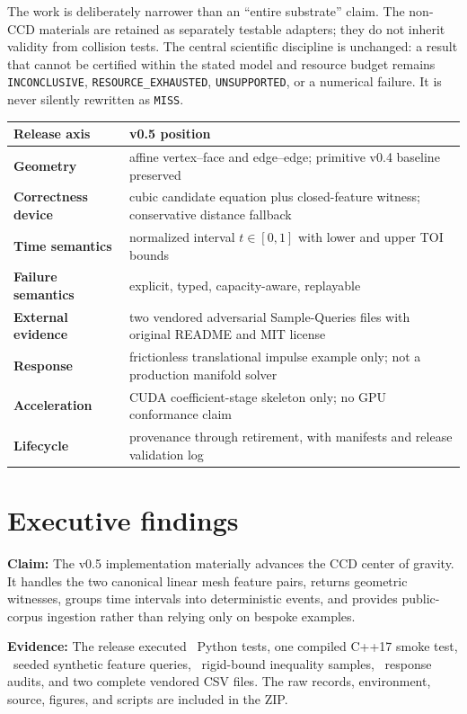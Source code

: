 \documentclass[11pt,a4paper,oneside]{book}
\newcommand{\status}[1]{\texttt{#1}}
\newcommand{\claim}[1]{\textbf{Claim:} #1}
\newcommand{\evidence}[1]{\textbf{Evidence:} #1}
\begin{document}
The work is deliberately narrower than an ``entire substrate'' claim. The non-CCD materials are retained as separately testable adapters; they do not inherit validity from collision tests. The central scientific discipline is unchanged: a result that cannot be certified within the stated model and resource budget remains \status{INCONCLUSIVE}, \status{RESOURCE\_EXHAUSTED}, \status{UNSUPPORTED}, or a numerical failure. It is never silently rewritten as \status{MISS}.

\begin{center}
\begin{tabularx}{0.94\textwidth}{>{\bfseries}p{}X}
\toprule
Release axis & v0.5 position\\
\midrule
Geometry & affine vertex--face and edge--edge; primitive v0.4 baseline preserved\\
Correctness device & cubic candidate equation plus closed-feature witness; conservative distance fallback\\
Time semantics & normalized interval $t\in[0,1]$ with lower and upper TOI bounds\\
Failure semantics & explicit, typed, capacity-aware, replayable\\
External evidence & two vendored adversarial Sample-Queries files with original README and MIT license\\
Response & frictionless translational impulse example only; not a production manifold solver\\
Acceleration & CUDA coefficient-stage skeleton only; no GPU conformance claim\\
Lifecycle & provenance through retirement, with manifests and release validation log\\
\bottomrule
\end{tabularx}
\end{center}

\chapter*{Executive findings}

\claim{The v0.5 implementation materially advances the CCD center of gravity.} It handles the two canonical linear mesh feature pairs, returns geometric witnesses, groups time intervals into deterministic events, and provides public-corpus ingestion rather than relying only on bespoke examples.

\evidence{The release executed \PythonTests\ Python tests, one compiled C++17 smoke test, \SyntheticTotalQueries\ seeded synthetic feature queries, \RigidSamples\ rigid-bound inequality samples, \ResponseSamples\ response audits, and two complete vendored CSV files.} The raw records, environment, source, figures, and scripts are included in the ZIP.
\end{document}
